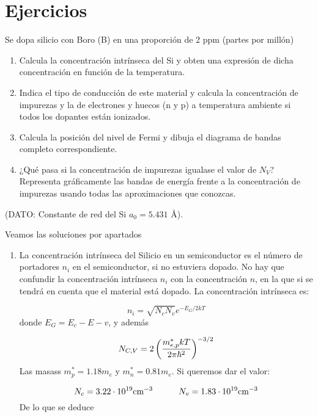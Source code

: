 \newpage


\section{Ejercicios}

\tcbstartrecording

\begin{texercise}
	Se dopa silicio con Boro (B) en una proporción de 2 ppm (partes por millón)
	\begin{enumerate}[label=\alph*)]
		\item Calcula la concentración intrínseca del Si y obten una expresión de dicha concentración en función de la temperatura.
		\item Indica el tipo de conducción de este material y calcula la concentración de impurezas y la de electrones y huecos (n y p) a temperatura ambiente si todos los dopantes están ionizados.
		\item Calcula la posición del nivel de Fermi y dibuja el diagrama de bandas completo correspondiente.
		\item ¿Qué pasa si la concentración de impurezas igualase el valor de \( N_V \)? Representa gráficamente las bandas de energía frente a la concentración de impurezas usando todas las aproximaciones que conozcas.
	\end{enumerate}
	(DATO: Constante de red del Si \( a_0 = 5.431 \) Å).

	\tcblower
	Veamos las soluciones por apartados
	\begin{enumerate}[label=\alph*)]
		\item La concentración intrínseca del Silicio en un semiconductor es el número de portadores $n_i$ en el semiconductor, si no estuviera dopado. No hay que confundir la concentración intrínseca $n_i$ con la concentración $n$, en la que si se tendrá en cuenta que el material está dopado. La concentración intrínseca es:
		
		\begin{equation}
			n_i = \sqrt{N_cN_v} e^{-E_G/2kT}
		\end{equation}
		donde $E_G=E_c-E-v$, y además

		\begin{equation}
			N_{C,V} = 2 \left( \frac{m_{e,p}^* kT}{2\pi\hbar^2} \right)^{-3/2}
		\end{equation}
		Las masass $m_p^*= 1.18m_e$ y $m_n^*=0.81m_e$. Si queremos dar el valor:

		\begin{equation}
			N_c = 3.22 \cdot 10^{19} \text{cm}^{-3} \quad \quad \quad 	N_v = 1.83 \cdot 10^{19} \text{cm}^{-3}
		\end{equation}
		De lo que se deduce


\end{enumerate}
\end{texercise}
